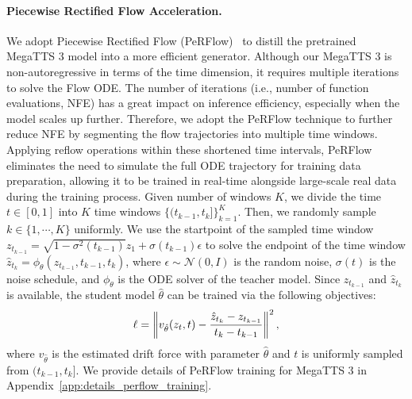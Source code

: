 \paragraph{Piecewise Rectified Flow Acceleration.}
We adopt Piecewise Rectified Flow (PeRFlow)~\citep{yan2024perflow} to distill the pretrained MegaTTS 3 model into a more efficient generator.
Although our MegaTTS 3 is non-autoregressive in terms of the time dimension, it requires multiple iterations to solve the Flow ODE. The number of iterations (i.e., number of function evaluations, NFE) has a great impact on inference efficiency, especially when the model scales up further. Therefore, we adopt the PeRFlow technique to further reduce NFE by segmenting the flow trajectories into multiple time windows. Applying reflow operations within these shortened time intervals, PeRFlow eliminates the need to simulate the full ODE trajectory for training data preparation, allowing it to be trained in real-time alongside large-scale real data during the training process. Given number of windows $K$, we divide the time $t\in[0,1]$ into $K$ time windows $\{ (t_{k-1}, t_{k}] \}^{K}_{k=1}$. Then, we randomly sample $k\in\{1,\cdots,K\}$ uniformly. We use the startpoint of the sampled time window $z_{t_{k-1}} = \sqrt{1 - \sigma^2(t_{k-1})} z_1 + \sigma(t_{k-1}) \epsilon$ to solve the endpoint of the time window $\hat{z}_{t_k} = \phi_{\theta}(z_{t_{k-1}}, t_{k-1}, t_{k})$, where $\epsilon \sim \mathcal{N}(0, I) $ is the random noise, $\sigma(t)$ is the noise schedule, and $\phi_{\theta}$ is the ODE solver of the teacher model. Since $z_{t_{k-1}}$ and $\hat{z}_{t_{k}}$ is available, the student model $\hat{\theta}$ can be trained via the following objectives:
\begin{equation}
    \small
    \ell = \left\lVert v_{\hat{\theta}}(z_t, t) - \frac{\hat{z}_{t_k} - z_{t_{k-1}}}{t_k - t_{k-1}} \right\lVert^2,
    \label{eq:3}
\end{equation}
where $v_{\hat{\theta}}$ is the estimated drift force with parameter $\hat{\theta}$ and $t$ is uniformly sampled from $(t_{k-1},t_{k}]$. We provide details of PeRFlow training for MegaTTS 3 in Appendix~\ref{app:details_perflow_training}.

